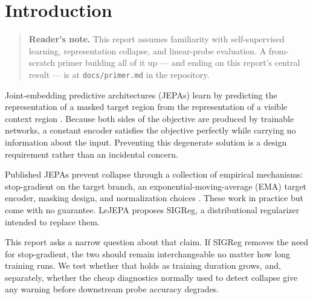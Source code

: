 \section{Introduction}

\begin{quote}\small
\textbf{Reader's note.} This report assumes familiarity with self-supervised learning,
representation collapse, and linear-probe evaluation. A from-scratch primer building all
of it up --- and ending on this report's central result --- is at \texttt{docs/primer.md}
in the repository.
\end{quote}

Joint-embedding predictive architectures (JEPAs) learn by predicting the representation of
a masked target region from the representation of a visible context region
\citep{assran2023ijepa}. Because both sides of the objective are produced by trainable
networks, a constant encoder satisfies the objective perfectly while carrying no
information about the input. Preventing this degenerate solution is a design requirement
rather than an incidental concern.

Published JEPAs prevent collapse through a collection of empirical mechanisms:
stop-gradient on the target branch, an exponential-moving-average (EMA) target encoder,
masking design, and normalization choices \citep{grill2020byol,chen2021simsiam}. These work
in practice but come with no guarantee. LeJEPA \citep{lejepa2025} proposes SIGReg, a
distributional regularizer intended to replace them.

This report asks a narrow question about that claim. If SIGReg removes the need for
stop-gradient, the two should remain interchangeable no matter how long training runs. We
test whether that holds as training duration grows, and, separately, whether the cheap
diagnostics normally used to detect collapse give any warning before downstream probe
accuracy degrades.
